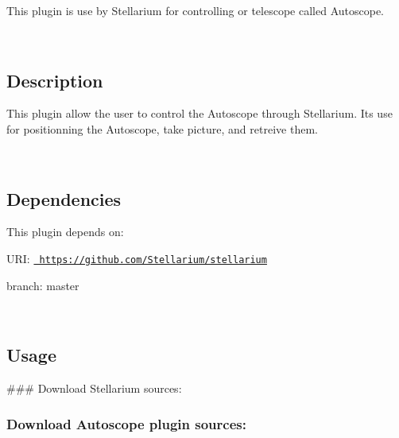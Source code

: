 This plugin is use by Stellarium for controlling or telescope called Autoscope.

~\newline


\subsection*{Description}

This plugin allow the user to control the Autoscope through Stellarium. It\textquotesingle{}s use for positionning the Autoscope, take picture, and retreive them.

~\newline


\subsection*{Dependencies}

This plugin depends on\+:


\begin{DoxyItemize}
\item U\+RI\+: \href{https://github.com/Stellarium/stellarium}{\texttt{ https\+://github.\+com/\+Stellarium/stellarium}}
\begin{DoxyItemize}
\item branch\+: master
\end{DoxyItemize}

~\newline

\end{DoxyItemize}

\subsection*{Usage}

\#\#\# Download Stellarium sources\+: 
\begin{DoxyCode}{0}
\DoxyCodeLine{~ \$}
\end{DoxyCode}


\subsubsection*{Download Autoscope plugin sources\+:}


\begin{DoxyCode}{0}
\end{DoxyCode}


